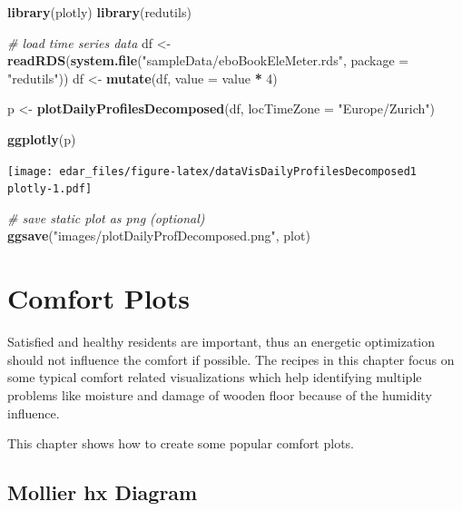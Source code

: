 \documentclass[
]{book}
\newenvironment{Shaded}{\begin{snugshade}}{\end{snugshade}}
\newcommand{\CommentTok}[1]{\textcolor[rgb]{0.56,0.35,0.01}{\textit{#1}}}
\newcommand{\DataTypeTok}[1]{\textcolor[rgb]{0.13,0.29,0.53}{#1}}
\newcommand{\DecValTok}[1]{\textcolor[rgb]{0.00,0.00,0.81}{#1}}
\newcommand{\KeywordTok}[1]{\textcolor[rgb]{0.13,0.29,0.53}{\textbf{#1}}}
\newcommand{\NormalTok}[1]{#1}
\newcommand{\OperatorTok}[1]{\textcolor[rgb]{0.81,0.36,0.00}{\textbf{#1}}}
\newcommand{\StringTok}[1]{\textcolor[rgb]{0.31,0.60,0.02}{#1}}
\let\oldShaded\Shaded
\let\endoldShaded\endShaded
\renewenvironment{Shaded}{\footnotesize\oldShaded}{\endoldShaded}
\begin{document}
\begin{Shaded}
\begin{Highlighting}[]
\KeywordTok{library}\NormalTok{(plotly)}
\KeywordTok{library}\NormalTok{(redutils)}

\CommentTok{# load time series data}
\NormalTok{df <-}\StringTok{ }\KeywordTok{readRDS}\NormalTok{(}\KeywordTok{system.file}\NormalTok{(}\StringTok{"sampleData/eboBookEleMeter.rds"}\NormalTok{, }\DataTypeTok{package =} \StringTok{"redutils"}\NormalTok{))}
\NormalTok{df <-}\StringTok{ }\KeywordTok{mutate}\NormalTok{(df, }\DataTypeTok{value =}\NormalTok{ value }\OperatorTok{*}\StringTok{ }\DecValTok{4}\NormalTok{)}

\NormalTok{p <-}\StringTok{ }\KeywordTok{plotDailyProfilesDecomposed}\NormalTok{(df, }\DataTypeTok{locTimeZone =} \StringTok{"Europe/Zurich"}\NormalTok{)}

\KeywordTok{ggplotly}\NormalTok{(p)}
\end{Highlighting}
\end{Shaded}

\texttt{[image: edar\_files/figure-latex/dataVisDailyProfilesDecomposed1 plotly-1.pdf]}

\begin{Shaded}
\begin{Highlighting}[]
\CommentTok{# save static plot as png (optional)}
\KeywordTok{ggsave}\NormalTok{(}\StringTok{"images/plotDailyProfDecomposed.png"}\NormalTok{, plot)}
\end{Highlighting}
\end{Shaded}

\hypertarget{comfort-plots}{%
\chapter{Comfort Plots}\label{comfort-plots}}

Satisfied and healthy residents are important, thus an energetic optimization should not influence the comfort if possible. The recipes in this chapter focus on some typical comfort related visualizations which help identifying multiple problems like moisture and damage of wooden floor because of the humidity influence.

This chapter shows how to create some popular comfort plots.

\hypertarget{mollier-hx-diagram}{%
\section{Mollier hx Diagram}\label{mollier-hx-diagram}}
\end{document}
